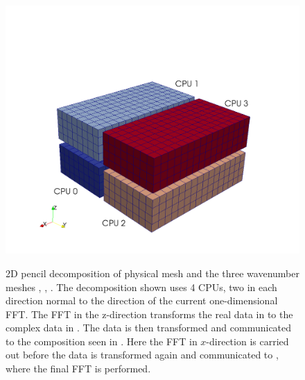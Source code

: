 \documentclass[11pt, oneside]{article}
\begin{document}
\begin{figure}
{  \includegraphics[scale=0.22]{pencil3.png}
  \label{subfig2}
  }
\caption{2D pencil decomposition of physical mesh  and the three wavenumber meshes , , . The decomposition shown uses 4 CPUs, two in each direction normal to the direction of the current one-dimensional FFT. The FFT in the z-direction transforms the real data in  to the complex data in . The data is then transformed and communicated to the composition seen in . Here the FFT in $x$-direction is carried out before the data is transformed again and communicated to , where the final FFT is performed.}
\label{fig:Pencildecomp}
\end{figure}
\end{document}
